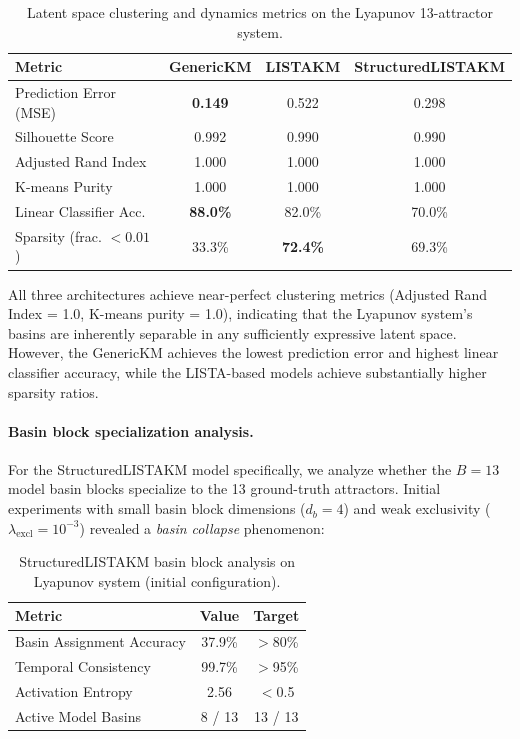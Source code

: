 \begin{table}[h]
\centering
\caption{Latent space clustering and dynamics metrics on the Lyapunov 13-attractor system.}
\label{tab:basin-results}
\begin{tabular}{lccc}
\toprule
\textbf{Metric} & \textbf{GenericKM} & \textbf{LISTAKM} & \textbf{StructuredLISTAKM} \\
\midrule
Prediction Error (MSE) & \textbf{0.149} & 0.522 & 0.298 \\
Silhouette Score & 0.992 & 0.990 & 0.990 \\
Adjusted Rand Index & 1.000 & 1.000 & 1.000 \\
K-means Purity & 1.000 & 1.000 & 1.000 \\
Linear Classifier Acc. & \textbf{88.0\%} & 82.0\% & 70.0\% \\
Sparsity (frac. $< 0.01$) & 33.3\% & \textbf{72.4\%} & 69.3\% \\
\bottomrule
\end{tabular}
\end{table}

All three architectures achieve near-perfect clustering metrics (Adjusted Rand Index = 1.0, K-means purity = 1.0), indicating that the Lyapunov system's basins are inherently separable in any sufficiently expressive latent space. However, the GenericKM achieves the lowest prediction error and highest linear classifier accuracy, while the LISTA-based models achieve substantially higher sparsity ratios.

\paragraph{Basin block specialization analysis.}
For the StructuredLISTAKM model specifically, we analyze whether the $B = 13$ model basin blocks specialize to the 13 ground-truth attractors. Initial experiments with small basin block dimensions ($d_b = 4$) and weak exclusivity ($\lambda_{\text{excl}} = 10^{-3}$) revealed a \emph{basin collapse} phenomenon:

\begin{table}[h]
\centering
\caption{StructuredLISTAKM basin block analysis on Lyapunov system (initial configuration).}
\label{tab:structured-basin}
\begin{tabular}{lcc}
\toprule
\textbf{Metric} & \textbf{Value} & \textbf{Target} \\
\midrule
Basin Assignment Accuracy & 37.9\% & $>$80\% \\
Temporal Consistency & 99.7\% & $>$95\% \\
Activation Entropy & 2.56 & $<$0.5 \\
Active Model Basins & 8 / 13 & 13 / 13 \\
\bottomrule
\end{tabular}
\end{table}

